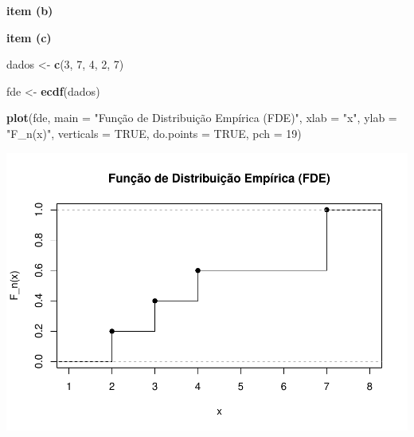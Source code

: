 \documentclass[
]{book}
\newenvironment{Shaded}{\begin{snugshade}}{\end{snugshade}}
\newcommand{\AttributeTok}[1]{\textcolor[rgb]{0.13,0.29,0.53}{#1}}
\newcommand{\ConstantTok}[1]{\textcolor[rgb]{0.56,0.35,0.01}{#1}}
\newcommand{\DecValTok}[1]{\textcolor[rgb]{0.00,0.00,0.81}{#1}}
\newcommand{\FunctionTok}[1]{\textcolor[rgb]{0.13,0.29,0.53}{\textbf{#1}}}
\newcommand{\NormalTok}[1]{#1}
\newcommand{\OtherTok}[1]{\textcolor[rgb]{0.56,0.35,0.01}{#1}}
\newcommand{\StringTok}[1]{\textcolor[rgb]{0.31,0.60,0.02}{#1}}
\begin{document}
\textbf{item (b)}

\begin{table}[!h]
\centering\begingroup\fontsize{8}{10}\selectfont

\endgroup{}
\end{table}

\textbf{item (c)}

\begin{Shaded}
\begin{Highlighting}[]
\NormalTok{dados }\OtherTok{\textless{}{-}} \FunctionTok{c}\NormalTok{(}\DecValTok{3}\NormalTok{, }\DecValTok{7}\NormalTok{, }\DecValTok{4}\NormalTok{, }\DecValTok{2}\NormalTok{, }\DecValTok{7}\NormalTok{)}

\NormalTok{fde }\OtherTok{\textless{}{-}} \FunctionTok{ecdf}\NormalTok{(dados)}

\FunctionTok{plot}\NormalTok{(fde, }\AttributeTok{main =} \StringTok{"Função de Distribuição Empírica (FDE)"}\NormalTok{, }
     \AttributeTok{xlab =} \StringTok{"x"}\NormalTok{, }\AttributeTok{ylab =} \StringTok{"F\_n(x)"}\NormalTok{, }\AttributeTok{verticals =} \ConstantTok{TRUE}\NormalTok{, }\AttributeTok{do.points =} \ConstantTok{TRUE}\NormalTok{, }\AttributeTok{pch =} \DecValTok{19}\NormalTok{)}
\end{Highlighting}
\end{Shaded}

\begin{center}\includegraphics{AED_files/figure-latex/cap6_ex4c-1} \end{center}
\end{document}

